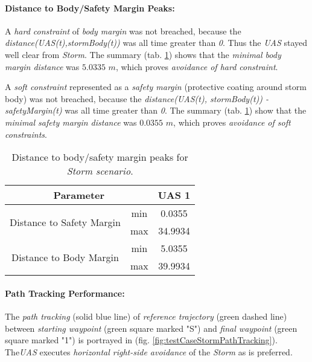     
    \paragraph{Distance to Body/Safety Margin Peaks:} A \emph{hard constraint} of \emph{body margin} was not breached, because the \emph{distance(UAS(t),stormBody(t))} was all time greater than \emph{0}. Thus the \emph{UAS} stayed well clear from \emph{Storm}. The summary (tab. \ref{tab:testCaseStormSafetyAndBodyMarginDistances}) shows that the \emph{minimal body margin distance} was $5.0335$ $m$, which proves \emph{avoidance of hard constraint}.
    
    A \emph{soft constraint} represented as a \emph{safety margin} (protective coating around storm body) was not breached, because the \emph{distance(UAS(t), stormBody(t)) - safetyMargin(t)} was all time greater than \emph{0}.  The summary (tab. \ref{tab:testCaseStormSafetyAndBodyMarginDistances}) show that the \emph{minimal safety margin distance} was $0.0355$ $m$, which proves \emph{avoidance of soft constraints}.
    
    \begin{table}[H]
        \centering
        \begin{tabular}{c|c||c}
        \multicolumn{2}{c||}{Parameter} & UAS 1 \\\hline\hline
        \multirow{2}{*}{Distance to Safety Margin} & min & 0.0355 \\\cline{2-3}
                                                & max & 34.9934 \\\hline
        \multirow{2}{*}{Distance to Body Margin}   & min & 5.0355 \\\cline{2-3}
                                                & max & 39.9934 
        \end{tabular}
        \caption{Distance to body/safety margin peaks for \emph{Storm scenario}.}
        \label{tab:testCaseStormSafetyAndBodyMarginDistances}
    \end{table}
    
    \paragraph{Path Tracking Performance:} The \emph{path tracking} (solid blue line) of \emph{reference trajectory} (green dashed line) between \emph{starting waypoint} (green square marked "S") and \emph{final waypoint} (green square marked "1") is portrayed in (fig. \ref{fig:testCaseStormPathTracking}). The\emph{UAS} executes \emph{horizontal right-side avoidance} of the \emph{Storm} as is preferred. 
    
